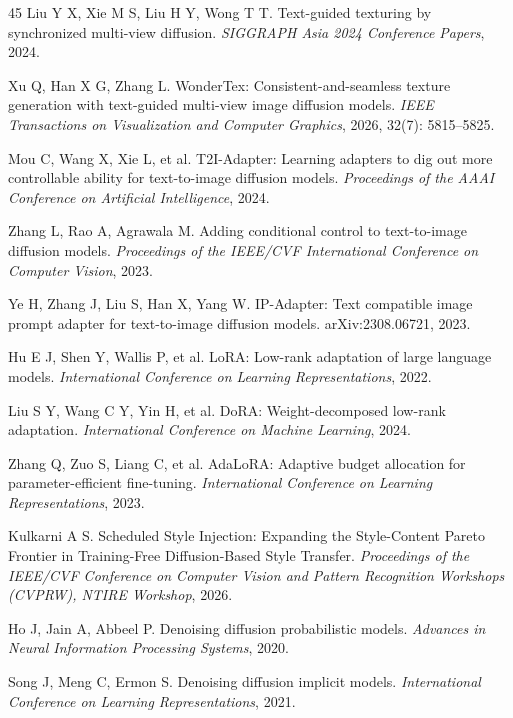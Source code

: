 \documentclass[times,twocolumn,final]{elsarticle}
\providecommand{\DIFadd}[1]{{\protect\color{blue} \sf #1}} %
\providecommand{\DIFaddbegin}{} %
\providecommand{\DIFaddend}{} %
\begin{document}
\begin{thebibliography}{45}
\DIFaddend {}
Liu Y X, Xie M S, Liu H Y, Wong T T. Text-guided texturing by synchronized multi-view diffusion. \textit{SIGGRAPH Asia 2024 Conference Papers}, 2024.

Xu Q, Han X G, Zhang L. WonderTex: Consistent-and-seamless texture generation with text-guided multi-view image diffusion models. \textit{IEEE Transactions on Visualization and Computer Graphics}, 2026, 32(7): 5815--5825.

Mou C, Wang X, Xie L, et al. T2I-Adapter: Learning adapters to dig out more controllable ability for text-to-image diffusion models. \textit{Proceedings of the AAAI Conference on Artificial Intelligence}, 2024.

Zhang L, Rao A, Agrawala M. Adding conditional control to text-to-image diffusion models. \textit{Proceedings of the IEEE/CVF International Conference on Computer Vision}, 2023.

Ye H, Zhang J, Liu S, Han X, Yang W. IP-Adapter: Text compatible image prompt adapter for text-to-image diffusion models. arXiv:2308.06721, 2023.

Hu E J, Shen Y, Wallis P, et al. LoRA: Low-rank adaptation of large language models. \textit{International Conference on Learning Representations}, 2022.

Liu S Y, Wang C Y, Yin H, et al. DoRA: Weight-decomposed low-rank adaptation. \textit{International Conference on Machine Learning}, 2024.

Zhang Q, Zuo S, Liang C, et al. AdaLoRA: Adaptive budget allocation for parameter-efficient fine-tuning. \textit{International Conference on Learning Representations}, 2023.

\DIFaddbegin {}
\DIFadd{Kulkarni A S. Scheduled Style Injection: Expanding the Style-Content Pareto Frontier in Training-Free Diffusion-Based Style Transfer. \textit{Proceedings of the IEEE/CVF Conference on Computer Vision and Pattern Recognition Workshops (CVPRW), NTIRE Workshop}, 2026.
}

\DIFaddend {}
Ho J, Jain A, Abbeel P. Denoising diffusion probabilistic models. \textit{Advances in Neural Information Processing Systems}, 2020.

Song J, Meng C, Ermon S. Denoising diffusion implicit models. \textit{International Conference on Learning Representations}, 2021.


\end{thebibliography}
\end{document}
